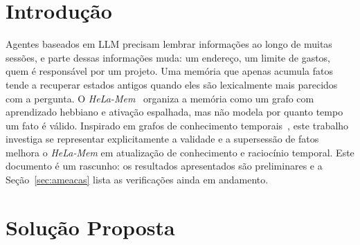 \documentclass[10pt,conference,twocolumn]{IEEEtran}
\begin{document}
\section{Introdução}
Agentes baseados em LLM precisam lembrar informações ao longo de muitas sessões, e parte dessas informações muda: um endereço, um limite de gastos, quem é responsável por um projeto. Uma memória que apenas acumula fatos tende a recuperar estados antigos quando eles são lexicalmente mais parecidos com a pergunta. O \textit{HeLa-Mem}~\cite{helamem2026} organiza a memória como um grafo com aprendizado hebbiano e ativação espalhada, mas não modela por quanto tempo um fato é válido. Inspirado em grafos de conhecimento temporais~\cite{zep2025}, este trabalho investiga se representar explicitamente a validade e a supersessão de fatos melhora o \textit{HeLa-Mem} em atualização de conhecimento e raciocínio temporal. Este documento é um rascunho: os resultados apresentados são preliminares e a Seção~\ref{sec:ameacas} lista as verificações ainda em andamento.

\section{Solução Proposta}
\end{document}
